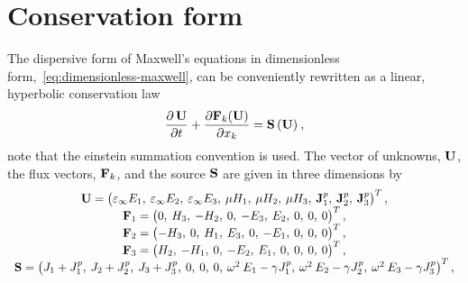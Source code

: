\section{Conservation form}
\label{sec:conservation-form}
The dispersive form of Maxwell's equations in dimensionless
form,~\eqref{eq:dimensionless-maxwell}, can be conveniently rewritten as a
linear, hyperbolic conservation law~\cite{Godlewski:2013tj,LeVeque:2002vc}
\begin{equation}
  \frac{\partial  \, \mathbf{U}}{\partial t} + \frac{\partial  \mathbf{F}_k(\mathbf{U}) }{\partial  x_k } = \mathbf{S}\,(\mathbf{U}) \: ,
  \label{eq:maxwell-curl-equations-conservation-form}
\end{equation}
note that the einstein summation convention is used. The vector of unknowns,
$\mathbf{U}$, the flux vectors, $\mathbf{F}_k$, and the source $\mathbf{S}$ are
given in three dimensions by
\begin{equation*}
  \begin{array}{c}
    \mathbf{U} =
    \begin{pmatrix}
      \varepsilon_{\infty} E_1, \: \varepsilon_{\infty} E_2 , \: \varepsilon_{\infty} E_3 , \: \mu
      H_1 , \: \mu H_2 , \: \mu H_3 , \: \mathbf{J}^p_1 , \: \mathbf{J}^p_2 , \: \mathbf{J}^p_3
    \end{pmatrix}^T,
    \\
    \mathbf{F}_1 =
    \begin{pmatrix}
      0 ,\: H_3 ,\: -H_2 ,\: 0 ,\: -E_3 ,\: E_2 ,\: 0 ,\: 0 ,\: 0
    \end{pmatrix}^T , \\

    \mathbf{F}_2 =
    \begin{pmatrix}
      - H_3 ,\: 0 ,\: H_1 ,\: E_3 ,\: 0 ,\: -E_1 ,\: 0 ,\: 0 ,\: 0
    \end{pmatrix}^T , \\

    \mathbf{F}_3 =
    \begin{pmatrix}
      H_2 ,\: -H_1 ,\: 0 ,\: -E_2 ,\: E_1 ,\: 0 ,\: 0 ,\: 0 ,\: 0
    \end{pmatrix}^T , \\

    \mathbf{S} =
    \begin{pmatrix}
      J_1 + J^p_1 ,\: J_2 + J^p_2 ,\: J_3 + J^p_3 ,\: 0 ,\: 0 ,\: 0 ,\: \omega^2
      \: E_1 - \gamma J^p_1 ,\: \omega^2 \: E_2 - \gamma J^p_2 ,\: \omega^2 \:
      E_3 - \gamma J^p_3
    \end{pmatrix}^T,

  \end{array}
\end{equation*}
